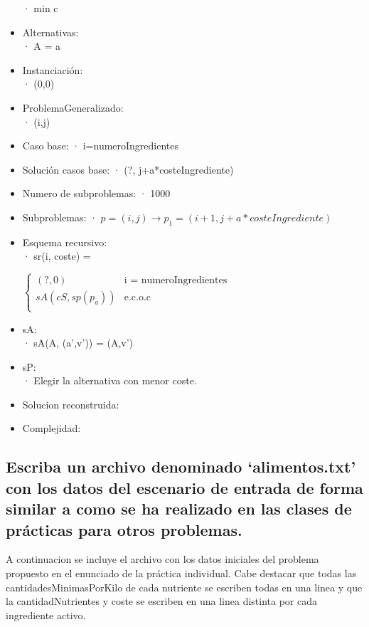 \documentclass[a4paper,12pt]{article}
\begin{document}
\begin{itemize}
        · min c
  \item Alternativas:\\
        · A = {a \in [0,1000]}
  \item Instanciación:\\
        · (0,0)
  \item ProblemaGeneralizado:\\
        · (i,j)
  \item Caso base:
        · i=numeroIngredientes
  \item Solución casos base:
        · (?, j+a*costeIngrediente)
  \item Numero de subproblemas:
        · 1000
  \item Subproblemas:
        · $p = (i,j) \rightarrow p_1 = (i+1, j+a*costeIngrediente)$
  \item Esquema recursivo:\\
        · sr(i, coste) =

        $\begin{cases}
        (?,0)  &\mbox{i = numeroIngredientes}\\
        sA(cS, sp(p_a)) &\mbox{e.c.o.c}\\

        \end{cases}$

  \item sA:\\
        · sA(A, (a',v')) = (A,v')
  \item sP:\\
        · Elegir la alternativa con menor coste.
  \item Solucion reconstruida:
  \item Complejidad:


\end{itemize}




\subsection{Escriba un archivo denominado `alimentos.txt' con los datos del escenario de entrada de forma similar a como se ha realizado en las clases de prácticas para otros problemas.}
A continuacion se incluye el archivo con los datos iniciales del problema propuesto en el enunciado de la práctica individual.
Cabe destacar que todas las cantidadesMinimasPorKilo de cada nutriente se escriben todas en una linea
y que la cantidadNutrientes y coste se escriben en una linea distinta por cada ingrediente activo.
\inputminted[fontsize=\footnotesize,breaklines]{text}{ficheros/alimentos.txt}
\end{document}
